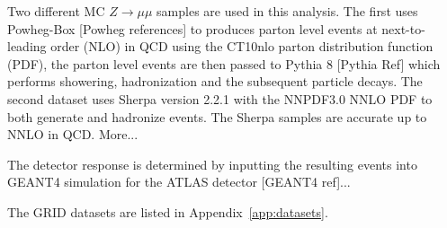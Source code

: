Two different MC $Z\rightarrow\mu\mu$ samples are used in this analysis. The first uses Powheg-Box [Powheg references] to produces parton level events at next-to-leading order (NLO) in QCD using the CT10nlo parton distribution function (PDF), the parton level events are
then passed to Pythia 8 [Pythia Ref] which performs showering, hadronization and the subsequent particle decays.
The second dataset uses Sherpa version 2.2.1 with the NNPDF3.0 NNLO PDF to both generate and hadronize events. The Sherpa samples are accurate up to NNLO in QCD. More...

The detector response is determined by inputting the resulting events into GEANT4 simulation for the ATLAS detector [GEANT4 ref]...

The GRID datasets are listed in Appendix~\ref{app:datasets}.
